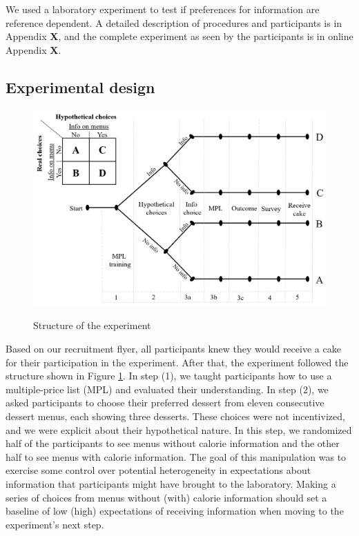 \documentclass[12pt]{article}
\begin{document}
We used a laboratory experiment to test if preferences for information are reference dependent. A detailed description of procedures and participants is in Appendix \textbf{X}, and the complete experiment as seen by the participants is in online Appendix \textbf{X}.

\subsection{Experimental design}

\begin{figure}[ht]
  \caption{Structure of the experiment}\label{fig:expDesign}
  \begin{center}
  {\includegraphics[width=1\textwidth]{./figures/experimentalDesign.png}}
  \end{center}
\end{figure}

Based on our recruitment flyer, all participants knew they would receive a cake for their participation in the experiment. After that, the experiment followed the structure shown in Figure \ref{fig:expDesign}. In step (1), we taught participants how to use a multiple-price list (MPL) and evaluated their understanding. In step (2), we asked participants to choose their preferred dessert from eleven consecutive dessert menus, each showing three desserts. These choices were not incentivized, and we were explicit about their hypothetical nature. In this step, we randomized half of the participants to see menus without calorie information and the other half to see menus with calorie information. The goal of this manipulation was to exercise some control over potential heterogeneity in expectations about information that participants might have brought to the laboratory. Making a series of choices from menus without (with) calorie information should set a baseline of low (high) expectations of receiving information when moving to the experiment’s next step.
\end{document}
